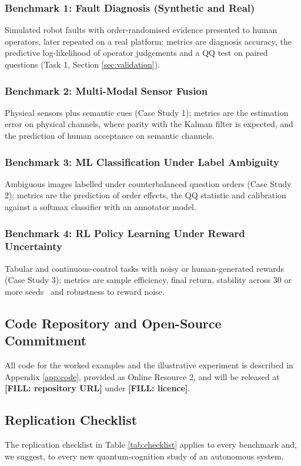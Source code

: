 \documentclass[pdflatex,sn-basic]{sn-jnl}
\newcommand{\fillin}[1]{{\color{red}\bfseries [FILL: #1]}}
\begin{document}
\subsubsection{Benchmark 1: Fault Diagnosis (Synthetic and Real)}
Simulated robot faults with order-randomised evidence presented to human operators, later repeated on a real platform; metrics are diagnosis accuracy, the predictive log-likelihood of operator judgements and a QQ test on paired questions (Task 1, Section \ref{sec:validation}).

\subsubsection{Benchmark 2: Multi-Modal Sensor Fusion}
Physical sensors plus semantic cues (Case Study 1); metrics are the estimation error on physical channels, where parity with the Kalman filter is expected, and the prediction of human acceptance on semantic channels.

\subsubsection{Benchmark 3: ML Classification Under Label Ambiguity}
Ambiguous images labelled under counterbalanced question orders (Case Study 2); metrics are the prediction of order effects, the QQ statistic and calibration against a softmax classifier with an annotator model.

\subsubsection{Benchmark 4: RL Policy Learning Under Reward Uncertainty}
Tabular and continuous-control tasks with noisy or human-generated rewards (Case Study 3); metrics are sample efficiency, final return, stability across 30 or more seeds~\citep{Henderson2018} and robustness to reward noise.

\subsection{Code Repository and Open-Source Commitment}
All code for the worked examples and the illustrative experiment is described in Appendix \ref{app:code}, provided as Online Resource 2, and will be released at \fillin{repository URL} under \fillin{licence}.

\subsection{Replication Checklist}
The replication checklist in Table \ref{tab:checklist} applies to every benchmark and, we suggest, to every new quantum-cognition study of an autonomous system.
\end{document}
